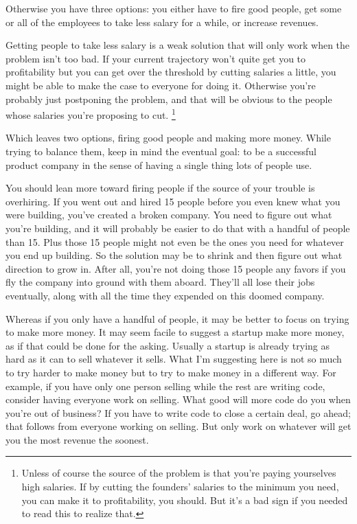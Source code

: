 Otherwise you have three options: you either have to fire good people,
get some or all of the employees to take less salary for a while, or
increase revenues.

Getting people to take less salary is a weak solution that will only
work when the problem isn't too bad. If your current trajectory won't
quite get you to profitability but you can get over the threshold by
cutting salaries a little, you might be able to make the case to
everyone for doing it. Otherwise you're probably just postponing the
problem, and that will be obvious to the people whose salaries you're
proposing to cut. \footnote{Unless of course the source of the problem is that you're paying
yourselves high salaries. If by cutting the founders' salaries to the
minimum you need, you can make it to profitability, you should. But it's
a bad sign if you needed to read this to realize that.}

Which leaves two options, firing good people and making more money.
While trying to balance them, keep in mind the eventual goal: to be a
successful product company in the sense of having a single thing lots of
people use.

You should lean more toward firing people if the source of your trouble
is overhiring. If you went out and hired 15 people before you even knew
what you were building, you've created a broken company. You need to
figure out what you're building, and it will probably be easier to do
that with a handful of people than 15. Plus those 15 people might not
even be the ones you need for whatever you end up building. So the
solution may be to shrink and then figure out what direction to grow in.
After all, you're not doing those 15 people any favors if you fly the
company into ground with them aboard. They'll all lose their jobs
eventually, along with all the time they expended on this doomed
company.

Whereas if you only have a handful of people, it may be better to focus
on trying to make more money. It may seem facile to suggest a startup
make more money, as if that could be done for the asking. Usually a
startup is already trying as hard as it can to sell whatever it sells.
What I'm suggesting here is not so much to try harder to make money but
to try to make money in a different way. For example, if you have only
one person selling while the rest are writing code, consider having
everyone work on selling. What good will more code do you when you're
out of business? If you have to write code to close a certain deal, go
ahead; that follows from everyone working on selling. But only work on
whatever will get you the most revenue the soonest.

